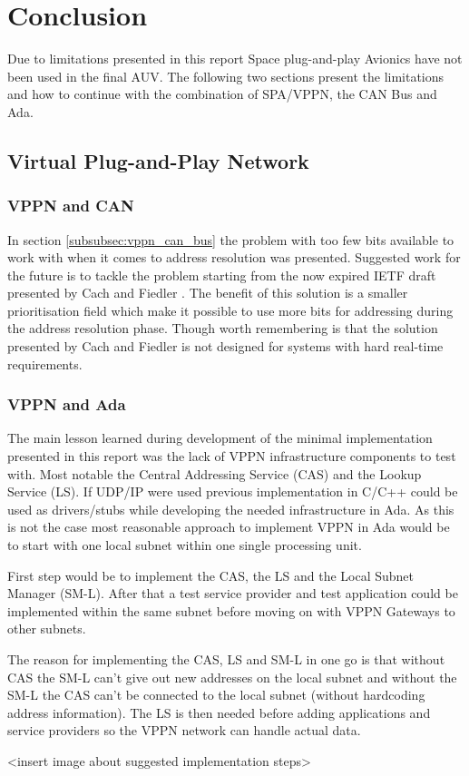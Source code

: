\section{Conclusion}\label{sec:conclusion}
Due to limitations presented in this report Space plug-and-play Avionics have
not been used in the final AUV. The following two sections present the
limitations and how to continue with the combination of SPA/VPPN, the CAN Bus
and Ada.

\subsection{Virtual Plug-and-Play Network}
\subsubsection{VPPN and CAN}
In section \ref{subsubsec:vppn_can_bus} the problem with too few bits
available to work with when it comes to address resolution was presented.
Suggested work for the future is to tackle the problem starting from the now
expired IETF draft presented by Cach and Fiedler \cite{web:draft-ip_over_can}.
The benefit of this solution is a
smaller prioritisation field which make it possible to use more bits for
addressing during the address resolution phase. Though worth remembering is
that the solution presented by Cach and Fiedler is not designed for systems
with hard real-time requirements.

\subsubsection{VPPN and Ada}
The main lesson learned during development of the minimal implementation
presented in this report was the lack of VPPN infrastructure
components to test with. Most notable the Central Addressing Service (CAS) and the
Lookup Service (LS). If UDP/IP were used previous implementation in C/C++ could be
used as drivers/stubs while developing the needed infrastructure in Ada. As
this is not the case most reasonable approach to implement VPPN in Ada would
be to start with one local subnet within one single processing unit.

First step would be to implement the CAS, the LS and the Local Subnet Manager (SM-L).
After that a test service provider and test application could be implemented
within the same subnet before moving on with VPPN Gateways to other subnets.

The reason for implementing the CAS, LS and SM-L in one go is
that without CAS the SM-L can't give out new addresses on the local subnet and
without the SM-L the CAS can't be connected to the local subnet (without
hardcoding address information). The LS is then needed before adding
applications and service providers so the VPPN network can handle actual data.

<insert image about suggested implementation steps>

